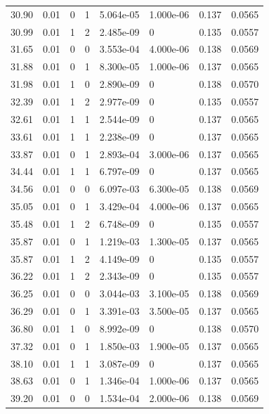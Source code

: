 \documentclass[preview]{standalone}
\begin{document}
{{{\begin{tabular}{L{1.2cm}C{1.2cm} C{0.3cm}C{0.5cm} C{1.4cm}C{1.4cm} C{1.4cm}C{1.4cm}}
  30.90  &  0.01  & 0     &  1 &  5.064e-05  & 1.000e-06  & 0.137 &  0.0565   \\ 
  30.99  &  0.01  & 1     &  2 &  2.485e-09  & 0  & 0.135 &  0.0557   \\ 
  31.65  &  0.01  & 0     &  0 &  3.553e-04  & 4.000e-06  & 0.138 &  0.0569   \\ 
  31.88  &  0.01  & 0     &  1 &  8.300e-05  & 1.000e-06  & 0.137 &  0.0565   \\ 
  31.98  &  0.01  & 1     &  0 &  2.890e-09  & 0  & 0.138 &  0.0570   \\ 
  32.39  &  0.01  & 1     &  2 &  2.977e-09  & 0  & 0.135 &  0.0557   \\ 
  32.61  &  0.01  & 1     &  1 &  2.544e-09  & 0  & 0.137 &  0.0565   \\ 
  33.61  &  0.01  & 1     &  1 &  2.238e-09  & 0  & 0.137 &  0.0565   \\ 
  33.87  &  0.01  & 0     &  1 &  2.893e-04  & 3.000e-06  & 0.137 &  0.0565   \\ 
  34.44  &  0.01  & 1     &  1 &  6.797e-09  & 0  & 0.137 &  0.0565   \\ 
  34.56  &  0.01  & 0     &  0 &  6.097e-03  & 6.300e-05  & 0.138 &  0.0569   \\ 
  35.05  &  0.01  & 0     &  1 &  3.429e-04  & 4.000e-06  & 0.137 &  0.0565   \\ 
  35.48  &  0.01  & 1     &  2 &  6.748e-09  & 0  & 0.135 &  0.0557   \\ 
  35.87  &  0.01  & 0     &  1 &  1.219e-03  & 1.300e-05  & 0.137 &  0.0565   \\ 
  35.87  &  0.01  & 1     &  2 &  4.149e-09  & 0  & 0.135 &  0.0557   \\ 
  36.22  &  0.01  & 1     &  2 &  2.343e-09  & 0  & 0.135 &  0.0557   \\ 
  36.25  &  0.01  & 0     &  0 &  3.044e-03  & 3.100e-05  & 0.138 &  0.0569   \\ 
  36.29  &  0.01  & 0     &  1 &  3.391e-03  & 3.500e-05  & 0.137 &  0.0565   \\ 
  36.80  &  0.01  & 1     &  0 &  8.992e-09  & 0  & 0.138 &  0.0570   \\ 
  37.32  &  0.01  & 0     &  1 &  1.850e-03  & 1.900e-05  & 0.137 &  0.0565   \\ 
  38.10  &  0.01  & 1     &  1 &  3.087e-09  & 0  & 0.137 &  0.0565   \\ 
  38.63  &  0.01  & 0     &  1 &  1.346e-04  & 1.000e-06  & 0.137 &  0.0565   \\ 
  39.20  &  0.01  & 0     &  0 &  1.534e-04  & 2.000e-06  & 0.138 &  0.0569   \\ 

\end{tabular}}}}
\end{document}
